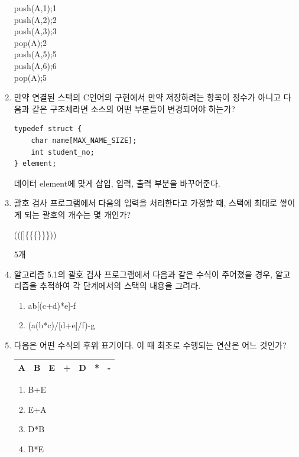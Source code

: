 \documentclass[11pt,a4paper]{article}
\begin{document}
\begin{enumerate}
push(A,1);\hspace{2cm}1\\push(A,2);\hspace{2cm}2\\push(A,3);\hspace{2cm}3\\
pop(A);\hspace{2.5cm}2\\
push(A,5);\hspace{2cm}5\\push(A,6);\hspace{2cm}6\\pop(A);\hspace{2.5cm}5\\

\item 만약 연결된 스택의 C언어의 구현에서 만약 저장하려는 항목이 정수가 아니고 다음과 같은 구조체라면 소스의 어떤 부분들이 변경되어야 하는가?

\begin{lstlisting}[frame=none]
typedef struct {
	char name[MAX_NAME_SIZE];
	int student_no;
} element;
\end{lstlisting}
데이터 element에 맞게 삽입, 입력, 출력 부분을 바꾸어준다.

\item 괄호 검사 프로그램에서 다음의 입력을 처리한다고 가정할 때, 스택에 최대로 쌓이게 되는 괄호의 개수는 몇 개인가?

(([]\{\{\{\}\}\}))

5개

\item 알고리즘 5.1의 괄호 검사 프로그램에서 다음과 같은 수식이 주어졌을 경우, 알고리즘을 추적하여 각 단계에서의 스택의 내용을 그려라. 
\begin{enumerate}
	\item a{b[(c+d)*e]-f}
	\item {(a(b*c)/[d+e]/f)-g}
\end{enumerate}

\item 다음은 어떤 수식의 후위 표기이다. 이 때 최초로 수행되는 연산은 어느 것인가?

\begin{tabular}{|c|c|c|c|c|c|c|}
\hline
A&B&E&+&D&*&-\\
\hline
\end{tabular}

\begin{enumerate}
	\item B+E
	\item E+A
	\item D*B
	\item B*E
\end{enumerate}
	

\end{enumerate}
\end{document}
